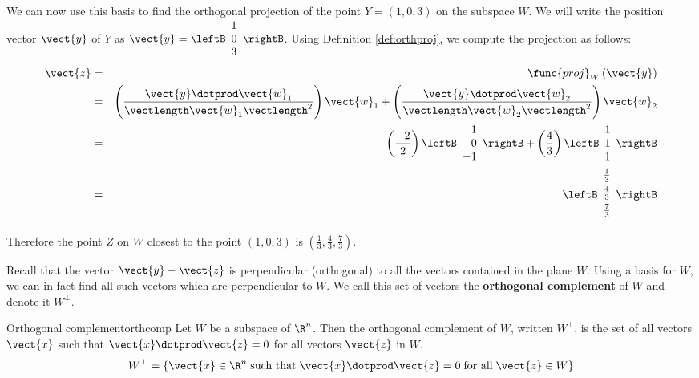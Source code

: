 \begin{solution}
We can now use this basis to find the orthogonal projection of the
point $Y=(1,0,3)$ on the subspace $W$. We will write the position
vector $\vect{y}$ of $Y$ as $\vect{y} = \leftB \begin{array}{c} 1 \\ 0 \\ 3
\end{array} \rightB$. Using Definition \ref{def:orthproj}, we compute the projection as follows:
\begin{eqnarray*}
\vect{z} &=& \func{proj}_{W}\left( \vect{y}\right)\\
&=&
\left( \frac{\vect{y} \dotprod \vect{w}_1}{ \vectlength \vect{w}_1 \vectlength^2}\right) \vect{w}_1
+
\left( \frac{\vect{y} \dotprod \vect{w}_2}{ \vectlength \vect{w}_2 \vectlength^2}\right) \vect{w}_2 \\
&=&
\left( \frac{-2}{2} \right) \leftB
\begin{array}{r}
1 \\
0 \\
-1
\end{array}
\rightB
+
\left( \frac{4}{3} \right)
\leftB
\begin{array}{c}
1 \\
1 \\
1 
\end{array}
\rightB \\
&=& 
\leftB
\begin{array}{c}
\vspace{0.05in}\frac{1}{3} \\
\vspace{0.05in}\frac{4}{3} \\
\vspace{0.05in}\frac{7}{3} 
\end{array}
\rightB
\end{eqnarray*}

Therefore the point $Z$ on $W$ closest to the point $(1,0,3)$  is $\left( \frac{1}{3}, \frac{4}{3}, \frac{7}{3} \right)$. 

\end{solution}

Recall that the vector $\vect{y} - \vect{z}$ is perpendicular
(orthogonal) to all the vectors contained in the plane $W$. Using a
basis for $W$, we can in fact find all such vectors which are
perpendicular to $W$. We call this set of vectors the
\textbf{orthogonal complement} of $W$ and
denote it $W^{\perp}$.

\begin{definition}{Orthogonal complement}{orthcomp}
Let $W$ be a subspace of $\R^n$. Then the orthogonal
complement of $W$, written $W^{\perp}$, is the set of all vectors
$\vect{x}$ such that $\vect{x} \dotprod \vect{z} = 0$ for all vectors
$\vect{z}$ in $W$.
\[
W^{\perp} = \{ \vect{x} \in \R^n \; \mbox{such that} \;
\vect{x} \dotprod \vect{z} = 0 \; \mbox{for all} \; \vect{z} \in W \}
\]
\end{definition}

